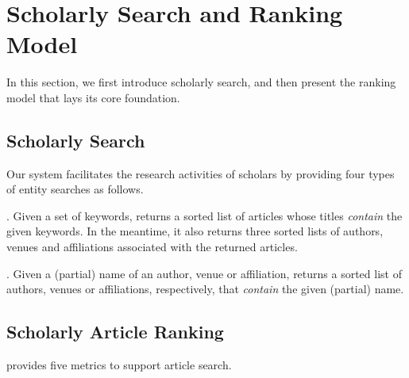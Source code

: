 \section{Scholarly Search and Ranking Model}
\label{sec-model}





In this section, we first introduce scholarly search, and then present the ranking model that lays its core foundation.


\subsection{Scholarly Search}
Our \oursystem system facilitates the research activities of scholars by providing four types of entity searches as follows.


. Given a set of keywords, \oursystem returns a sorted list of  articles whose titles {\em contain} the given keywords. In the meantime, it also returns three sorted lists of authors, venues and affiliations associated with the returned articles.


. Given a (partial) name of an author, venue or affiliation, \oursystem returns a sorted list of  authors, venues or affiliations, respectively, that {\em contain} the given (partial) name.




\subsection{Scholarly Article Ranking}
\label{subsec:rankingMetric}

\oursystem provides five metrics to support article search.



